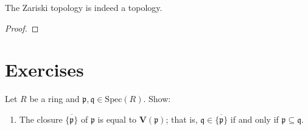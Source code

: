 \begin{prps}
    The Zariski topology is indeed a topology.
\end{prps}
\begin{proof}
    
\end{proof}

\section{Exercises}
\begin{exr}
    Let \(R\) be a ring and \(\mathfrak{p}, \mathfrak{q} \in \mathrm{Spec}(R)\). Show:
    \begin{enumerate}
        \item The closure \(\overline{\{\mathfrak{p}\}}\) of \(\mathfrak{p}\) is equal to \(\mathbf{V}(\mathfrak{p})\); that is, \(\mathfrak{q} \in \overline{\{\mathfrak{p}\}}\) if and only if \(\mathfrak{p} \subseteq \mathfrak{q}\).
    \end{enumerate}
\end{exr}